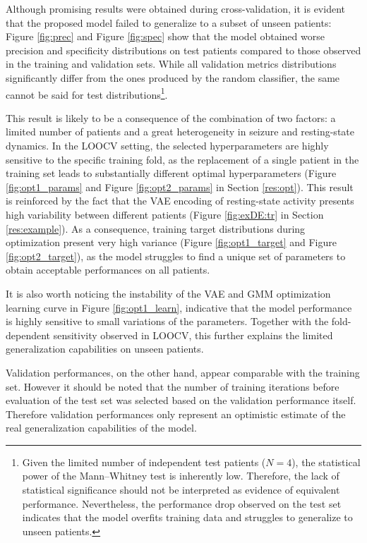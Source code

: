 Although promising results were obtained during cross-validation, it is evident 
that the proposed model failed to generalize to a subset of unseen patients:
Figure \ref{fig:prec} and Figure \ref{fig:spec} show that the 
model obtained worse precision and specificity distributions on test patients
compared to those observed in the training and validation sets.
While all validation metrics distributions significantly differ from the ones
produced by the random classifier, the same cannot be said for test
distributions\footnote{
Given the limited number of independent test patients ($N = 4$), the statistical 
power of the Mann–Whitney test is inherently low. Therefore, the lack of 
statistical significance should not be interpreted as evidence of equivalent
performance.
Nevertheless, the performance drop observed on the test set indicates that the
model overfits training data and struggles to generalize to unseen patients.}.

This result is likely to be a consequence of the combination of two factors:
a limited number of patients and a great heterogeneity in seizure and 
resting-state dynamics.
In the LOOCV setting, the selected hyperparameters are highly sensitive to the
specific training fold, as
the replacement of a single patient in the training set leads to substantially
different optimal hyperparameters (Figure \ref{fig:opt1_params} and Figure
\ref{fig:opt2_params} in Section \ref{res:opt}).
This result is reinforced by the fact that the VAE encoding of resting-state 
activity presents high variability between different patients (Figure
\ref{fig:exDE:tr} in Section \ref{res:example}).
As a consequence, training target distributions during optimization present
very high variance (Figure \ref{fig:opt1_target} and Figure
\ref{fig:opt2_target}), as the model struggles to
find a unique set of parameters to obtain acceptable performances on all
patients.

It is also worth noticing the instability of the VAE and GMM optimization
learning curve in Figure \ref{fig:opt1_learn}, indicative that the model
performance is highly sensitive to small variations of the parameters.
Together with the fold-dependent sensitivity observed in LOOCV, this further
explains the limited generalization capabilities on unseen patients.

Validation performances, on the other hand, appear comparable with the training
set.
However it should be noted that the number of training iterations before 
evaluation of the test set was selected based on the validation performance
itself.
Therefore validation performances only represent an optimistic estimate of the 
real generalization capabilities of the model.

